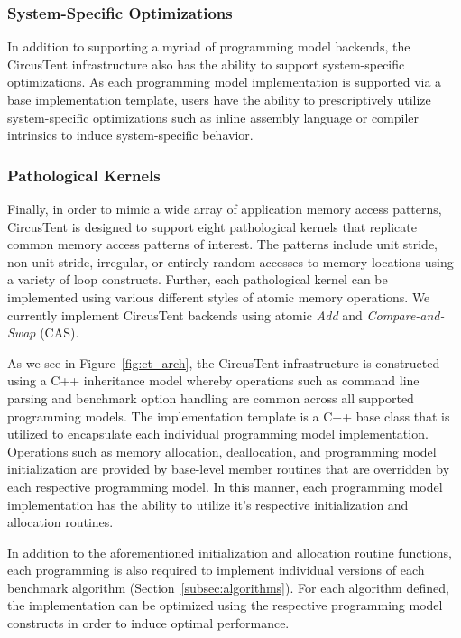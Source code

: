 \subsubsection*{System-Specific Optimizations}

In addition to supporting a myriad of programming model backends, the CircusTent infrastructure also has the ability to support system-specific optimizations.
As each programming model implementation is supported via a base implementation template, users have the ability to prescriptively utilize system-specific optimizations such as inline assembly language or compiler intrinsics to induce system-specific behavior.

\subsubsection*{Pathological Kernels}

Finally, in order to mimic a wide array of application memory access patterns, CircusTent is designed to support eight pathological kernels that replicate common memory access patterns of interest.
The patterns include unit stride, non unit stride, irregular, or entirely random accesses to memory locations using a variety of loop constructs.
Further, each pathological kernel can be implemented using various different styles of atomic memory operations.
We currently implement CircusTent backends using atomic \textit{Add} and \textit{Compare-and-Swap} (CAS).    

As we see in Figure~\ref{fig:ct_arch}, the CircusTent infrastructure is constructed using a C++ inheritance model whereby operations such as command line parsing and benchmark option handling are common across all supported programming models.
The implementation template is a C++ base class that is utilized to encapsulate each individual programming model implementation.
Operations such as memory allocation, deallocation, and programming model initialization are provided by base-level member routines that are overridden by each respective programming model.
In this manner, each programming model implementation has the ability to utilize it's respective initialization and allocation routines.

In addition to the aforementioned initialization and allocation routine functions, each programming is also required to implement individual versions of each benchmark algorithm (Section~\ref{subsec:algorithms}).
For each algorithm defined, the implementation can be optimized using the respective programming model constructs in order to induce optimal performance.

